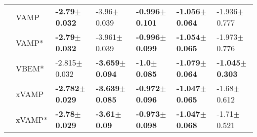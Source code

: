 \begin{tabular}{lllllll}
             & VAMP &   \textbf{-2.79$\pm$0.032} &            -3.96$\pm$0.039 &  \textbf{-0.996$\pm$0.101} &  \textbf{-1.056$\pm$0.064} &           -1.936$\pm$0.777 \\
             & VAMP* &   \textbf{-2.79$\pm$0.032} &           -3.961$\pm$0.039 &  \textbf{-0.996$\pm$0.099} &  \textbf{-1.054$\pm$0.065} &           -1.973$\pm$0.776 \\
             & VBEM* &           -2.815$\pm$0.032 &  \textbf{-3.659$\pm$0.094} &    \textbf{-1.0$\pm$0.085} &  \textbf{-1.079$\pm$0.064} &  \textbf{-1.045$\pm$0.303} \\
             & xVAMP &  \textbf{-2.782$\pm$0.029} &  \textbf{-3.639$\pm$0.085} &  \textbf{-0.972$\pm$0.096} &  \textbf{-1.047$\pm$0.065} &            -1.68$\pm$0.612 \\
             & xVAMP* &   \textbf{-2.78$\pm$0.029} &    \textbf{-3.61$\pm$0.09} &  \textbf{-0.973$\pm$0.098} &  \textbf{-1.047$\pm$0.068} &            -1.71$\pm$0.521 \\
\bottomrule
\end{tabular}

